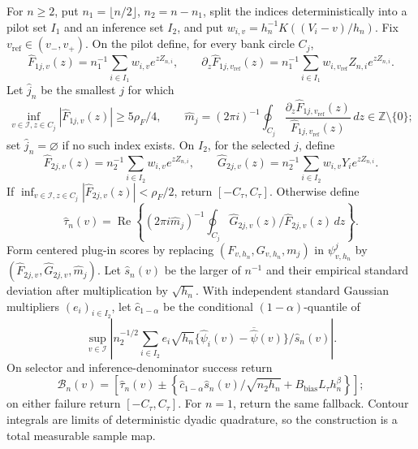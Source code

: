 For \(n\ge2\), put \(n_1=\lfloor n/2\rfloor\), \(n_2=n-n_1\), split the indices deterministically into a pilot set \(I_1\) and an inference set \(I_2\), and put \(w_{i,v}=h_n^{-1}K((V_i-v)/h_n)\).  Fix \(v_{\mathrm{ref}}\in(v_-,v_+)\).  On the pilot define, for every bank circle \(C_j\),
\[
 \widehat F_{1j,v}(z)=n_1^{-1}\sum_{i\in I_1}w_{i,v}e^{zZ_{n,i}},\qquad
 \partial_z\widehat F_{1j,v_{\mathrm{ref}}}(z)
 =n_1^{-1}\sum_{i\in I_1}w_{i,v_{\mathrm{ref}}}Z_{n,i}e^{zZ_{n,i}}.
\]
Let \(\widehat j_n\) be the smallest \(j\) for which
\[
 \inf_{v\in\mathcal I,z\in C_j}|\widehat F_{1j,v}(z)|
 \ge5\rho_F/4,
 \qquad
 \widehat m_j=(2\pi i)^{-1}\oint_{C_j}
 \frac{\partial_z\widehat F_{1j,v_{\mathrm{ref}}}(z)}
 {\widehat F_{1j,v_{\mathrm{ref}}}(z)}\,dz
 \in\mathbb Z\setminus\{0\};
\]
set \(\widehat j_n=\varnothing\) if no such index exists.  On \(I_2\), for the selected \(j\), define
\[
 \widehat F_{2j,v}(z)=n_2^{-1}\sum_{i\in I_2}w_{i,v}e^{zZ_{n,i}},\qquad
 \widehat G_{2j,v}(z)=n_2^{-1}\sum_{i\in I_2}w_{i,v}Y_i e^{zZ_{n,i}}.
\]
If \(\inf_{v\in\mathcal I,z\in C_j}|\widehat F_{2j,v}(z)|<\rho_F/2\), return \([-C_\tau,C_\tau]\).  Otherwise define
\[
 \widehat\tau_n(v)=\operatorname{Re}\left\{(2\pi i\widehat m_j)^{-1}
 \oint_{C_j}\widehat G_{2j,v}(z)/\widehat F_{2j,v}(z)\,dz\right\}.
\]
Form centered plug-in scores by replacing \((F_{v,h_n},G_{v,h_n},m_j)\) in \(\psi^j_{v,h_n}\) by \((\widehat F_{2j,v},\widehat G_{2j,v},\widehat m_j)\).  Let \(\widehat s_n(v)\) be the larger of \(n^{-1}\) and their empirical standard deviation after multiplication by \(\sqrt{h_n}\).  With independent standard Gaussian multipliers \((e_i)_{i\in I_2}\), let \(\widehat c_{1-\alpha}\) be the conditional \((1-\alpha)\)-quantile of
\[
 \sup_{v\in\mathcal I}\left|n_2^{-1/2}\sum_{i\in I_2}e_i\sqrt{h_n}
 \{\widehat\psi_i(v)-\overline{\widehat\psi}(v)\}/\widehat s_n(v)\right|.
\]
On selector and inference-denominator success return
\[
 \mathcal B_n(v)=\left[\widehat\tau_n(v)\pm
 \left\{\widehat c_{1-\alpha}\widehat s_n(v)/\sqrt{n_2h_n}
 +B_{\mathrm{bias}}L_\tau h_n^\beta\right\}\right];
\]
on either failure return \([-C_\tau,C_\tau]\).  For \(n=1\), return the same fallback.  Contour integrals are limits of deterministic dyadic quadrature, so the construction is a total measurable sample map.